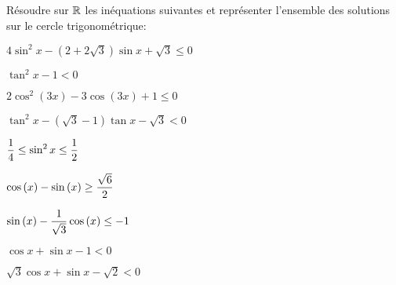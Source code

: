 \documentclass[a4paper, 11pt]{article}
\begin{document}
\begin{exercice}  \;
R\'esoudre sur $\mathbb{R}$ les in\'equations suivantes et repr\'esenter l'ensemble des solutions sur le cercle trigonom\'etrique:
\begin{enumerate}
\begin{minipage}[t]{0.45\textwidth}
\item $4\sin^2{x}-(2+2\sqrt{3})\sin{x}+\sqrt{3}\leq 0$
\item $\tan^2{x}-1<0$
\item $2\cos^2{(3x)}-3\cos{(3x)}+1\leq 0$   
\item $\tan^2{x}-(\sqrt{3}-1)\tan{x}-\sqrt{3}<0$
\item $\displaystyle\frac{1}{4}\leq \sin^2{x}\leq \displaystyle\frac{1}{2}$
\end{minipage}
\begin{minipage}[t]{0.45\textwidth}
\item $\cos{(x)}-\sin{(x)}\geq \displaystyle\frac{\sqrt{6}}{2}$  
\item $\sin{(x)}-\displaystyle\frac{1}{\sqrt{3}}\cos{(x)}\leq -1$
\item $\cos{x}+\sin{x}-1<0$
\item $\sqrt{3}\cos{x}+\sin{x}-\sqrt{2}<0$
\end{minipage}
\end{enumerate}
\end{exercice}
\end{document}
